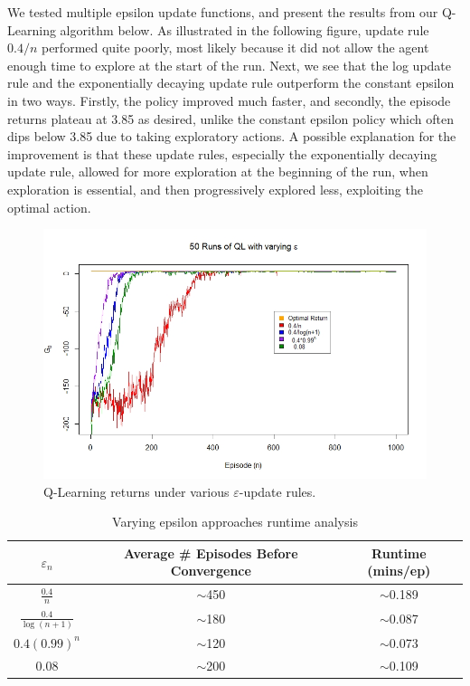 \documentclass[final,12pt,3p]{elsarticle}
\begin{document}
\par
We tested multiple epsilon update functions, and present the results from our Q-Learning algorithm below. As illustrated in the following figure, update rule $0.4/n$ performed quite poorly, most likely because it did not allow the agent enough time to explore at the start of the run. Next, we see that the log update rule and the exponentially decaying update rule outperform the constant epsilon in two ways. Firstly, the policy improved much faster, and secondly, the episode returns plateau at 3.85 as desired, unlike the constant epsilon policy which often dips below 3.85 due to taking exploratory actions. A possible explanation for the improvement is that these update rules, especially the exponentially decaying update rule, allowed for more exploration at the beginning of the run, when exploration is essential, and then progressively explored less, exploiting the optimal action.

\begin{figure}[H]
    \centering
    \caption{Q-Learning returns under various $\varepsilon$-update rules.}
    \includegraphics[width=13cm]{figures/VaryingEpsilon.jpeg}
\end{figure}

\begin{table}[H]
    \centering
    \caption{Varying epsilon approaches runtime analysis}
    \begin{tabular}{|c|c|c|}
        \hline
        \textbf{$\varepsilon_n$} & \textbf{Average \# Episodes Before Convergence} & \textbf{Runtime (mins/ep)} \\ \hline
        $\frac{0.4}{n}$ & $\sim$450 & $\sim$0.189 \\ \hline
        $\frac{0.4}{\log(n+1)}$ & $\sim$180 & $\sim$0.087 \\ \hline
        $0.4(0.99)^n$ & $\sim$120 & $\sim$0.073 \\ \hline
        $0.08$ & $\sim$200 & $\sim$0.109 \\ \hline
    \end{tabular}
\end{table}
\end{document}
